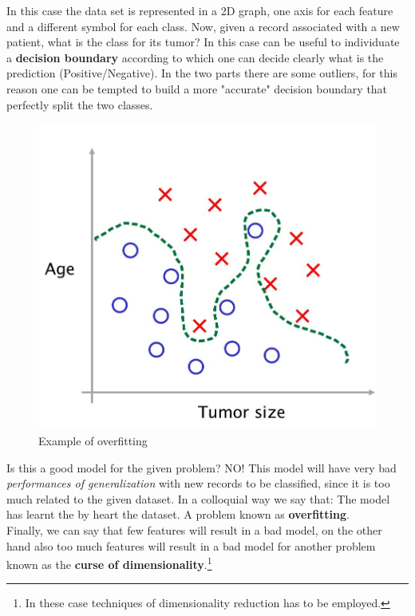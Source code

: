 In this case the data set is represented in a 2D graph, one axis for each feature and a different symbol for each class. Now, given a record associated with a new patient, what is the class for its tumor? In this case can be useful to individuate a \textbf{decision boundary} according to which one can decide clearly what is the prediction (Positive/Negative). In the two parts there are some outliers, for this reason one can be tempted to build a more "accurate" decision boundary that perfectly split the two classes.

\begin{figure}[h]
    \centering
    \includegraphics[scale=0.2]{img/overfit.jpeg}
    \caption{Example of overfitting}
\end{figure}

\noindent
Is this a good model for the given problem? NO! This model will have very bad \textit{performances of generalization} with new records to be classified, since it is too much related to the given dataset. In a colloquial way we say that: \textsf{The model has learnt the by heart the dataset}. A problem known as \textbf{overfitting}. \\
Finally, we can say that few features will result in a bad model, on the other hand also too much features will result in a bad model for another problem known as the \textbf{curse of dimensionality}.\footnote{
    In these case techniques of dimensionality reduction has to be employed.
}

